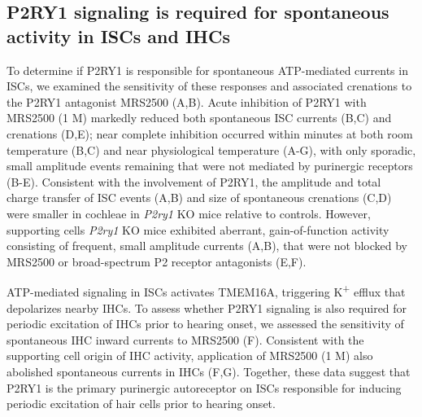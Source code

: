 \documentclass[9pt,lineno]{elife}
\begin{document}
\subsection{P2RY1 signaling is required for spontaneous activity in ISCs and IHCs}
To determine if P2RY1 is responsible for spontaneous ATP-mediated currents in ISCs, we examined the sensitivity of these responses and associated crenations to the P2RY1 antagonist MRS2500 (A,B). Acute inhibition of P2RY1 with MRS2500 (1 \textmu M) markedly reduced both spontaneous ISC currents (B,C) and crenations (D,E); near complete inhibition occurred within minutes at both room temperature (B,C) and near physiological temperature (A-G), with only sporadic, small amplitude events remaining that were not mediated by purinergic receptors (B-E). Consistent with the involvement of P2RY1, the amplitude and total charge transfer of ISC events (A,B) and size of spontaneous crenations (C,D) were smaller in cochleae in \textit{P2ry1} KO mice relative to controls. However, supporting cells \textit{P2ry1} KO mice exhibited aberrant, gain-of-function activity consisting of frequent, small amplitude currents (A,B), that were not blocked by MRS2500 or broad-spectrum P2 receptor antagonists (E,F). 

ATP-mediated signaling in ISCs activates TMEM16A, triggering K\textsuperscript{+} efflux that depolarizes nearby IHCs. To assess whether P2RY1 signaling is also required for periodic excitation of IHCs prior to hearing onset, we assessed the sensitivity of spontaneous IHC inward currents to MRS2500 (F). Consistent with the supporting cell origin of IHC activity, application of MRS2500 (1 \textmu M) also abolished spontaneous currents in IHCs (F,G). Together, these data suggest that P2RY1 is the primary purinergic autoreceptor on ISCs responsible for inducing periodic excitation of hair cells prior to hearing onset. 
\end{document}
